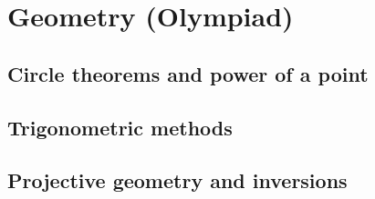 
\section{Geometry (Olympiad)}

\subsection{Circle theorems and power of a point}


\subsection{Trigonometric methods}


\subsection{Projective geometry and inversions}

